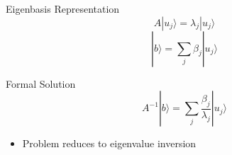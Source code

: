 \documentclass{beamer}
\begin{document}
\begin{frame}{Eigenbasis Representation}
\[
A |u_j\rangle = \lambda_j |u_j\rangle
\]
\[
|b\rangle = \sum_j \beta_j |u_j\rangle
\]
\end{frame}


\begin{frame}{Formal Solution}
\[
A^{-1}|b\rangle = \sum_j \frac{\beta_j}{\lambda_j} |u_j\rangle
\]
\begin{itemize}
\item Problem reduces to eigenvalue inversion
\end{itemize}
\end{frame}
\end{document}

